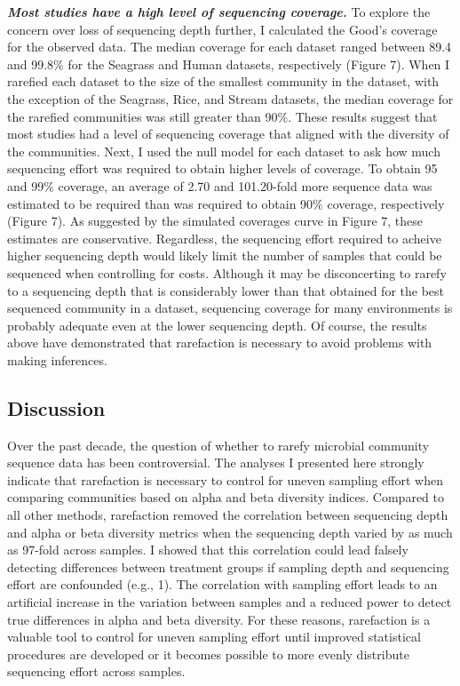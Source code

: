 \documentclass[
]{article}
\begin{document}
\textbf{\emph{Most studies have a high level of sequencing coverage.}}
To explore the concern over loss of sequencing depth further, I
calculated the Good's coverage for the observed data. The median
coverage for each dataset ranged between 89.4 and 99.8\% for the
Seagrass and Human datasets, respectively (Figure 7). When I rarefied
each dataset to the size of the smallest community in the dataset, with
the exception of the Seagrass, Rice, and Stream datasets, the median
coverage for the rarefied communities was still greater than 90\%. These
results suggest that most studies had a level of sequencing coverage
that aligned with the diversity of the communities. Next, I used the
null model for each dataset to ask how much sequencing effort was
required to obtain higher levels of coverage. To obtain 95 and 99\%
coverage, an average of 2.70 and 101.20-fold more sequence data was
estimated to be required than was required to obtain 90\% coverage,
respectively (Figure 7). As suggested by the simulated coverages curve
in Figure 7, these estimates are conservative. Regardless, the
sequencing effort required to acheive higher sequencing depth would
likely limit the number of samples that could be sequenced when
controlling for costs. Although it may be disconcerting to rarefy to a
sequencing depth that is considerably lower than that obtained for the
best sequenced community in a dataset, sequencing coverage for many
environments is probably adequate even at the lower sequencing depth. Of
course, the results above have demonstrated that rarefaction is
necessary to avoid problems with making inferences.

\hypertarget{discussion}{%
\subsection{Discussion}\label{discussion}}

Over the past decade, the question of whether to rarefy microbial
community sequence data has been controversial. The analyses I presented
here strongly indicate that rarefaction is necessary to control for
uneven sampling effort when comparing communities based on alpha and
beta diversity indices. Compared to all other methods, rarefaction
removed the correlation between sequencing depth and alpha or beta
diversity metrics when the sequencing depth varied by as much as 97-fold
across samples. I showed that this correlation could lead falsely
detecting differences between treatment groups if sampling depth and
sequencing effort are confounded (e.g., 1). The correlation with
sampling effort leads to an artificial increase in the variation between
samples and a reduced power to detect true differences in alpha and beta
diversity. For these reasons, rarefaction is a valuable tool to control
for uneven sampling effort until improved statistical procedures are
developed or it becomes possible to more evenly distribute sequencing
effort across samples.
\end{document}

